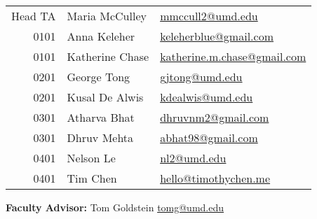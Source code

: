 \documentclass[12pt]{article}
\begin{document}
\begin{table}[h!]
  \begin{tabular}{rll}
    Head TA & Maria McCulley  & \href{mailto:mmccull2@umd.edu}{mmccull2@umd.edu}\\
    0101    & Anna Keleher    & \href{mailto:keleherblue@gmail.com}{keleherblue@gmail.com}\\
    0101    & Katherine Chase & \href{mailto:katherine.m.chase@gmail.com}
                                {katherine.m.chase@gmail.com}\\
    0201    & George Tong     & \href{mailto:gjtong@umd.edu}{gjtong@umd.edu}\\
    0201    & Kusal De Alwis  & \href{mailto:kdealwis@umd.edu}{kdealwis@umd.edu}\\
    0301    & Atharva Bhat    & \href{mailto:dhruvnm2@gmail.com}{dhruvnm2@gmail.com}\\
    0301    & Dhruv Mehta     & \href{mailto:abhat98@gmail.com}{abhat98@gmail.com}\\
    0401    & Nelson Le       & \href{mailto:nle@umd.edu}{nl2@umd.edu}\\
    0401    & Tim Chen        & \href{mailto:hello@timothychen.me}{hello@timothychen.me}
  \end{tabular}
\end{table}
\medskip

\noindent\textbf{Faculty Advisor: }Tom Goldstein
\href{mailto:tomg@umd.edu}{tomg@umd.edu} \medskip

\bigskip
\end{document}
